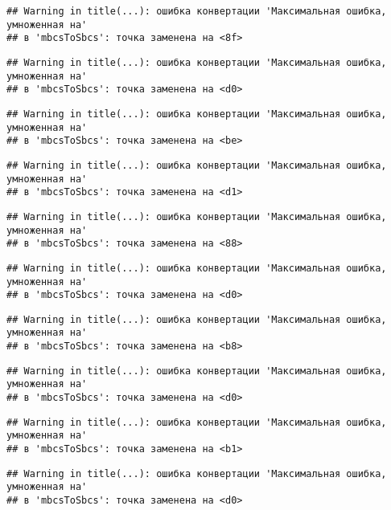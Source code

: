 \documentclass[
]{article}
\begin{document}
\begin{verbatim}
## Warning in title(...): ошибка конвертации 'Максимальная ошибка, умноженная на'
## в 'mbcsToSbcs': точка заменена на <8f>
\end{verbatim}

\begin{verbatim}
## Warning in title(...): ошибка конвертации 'Максимальная ошибка, умноженная на'
## в 'mbcsToSbcs': точка заменена на <d0>
\end{verbatim}

\begin{verbatim}
## Warning in title(...): ошибка конвертации 'Максимальная ошибка, умноженная на'
## в 'mbcsToSbcs': точка заменена на <be>
\end{verbatim}

\begin{verbatim}
## Warning in title(...): ошибка конвертации 'Максимальная ошибка, умноженная на'
## в 'mbcsToSbcs': точка заменена на <d1>
\end{verbatim}

\begin{verbatim}
## Warning in title(...): ошибка конвертации 'Максимальная ошибка, умноженная на'
## в 'mbcsToSbcs': точка заменена на <88>
\end{verbatim}

\begin{verbatim}
## Warning in title(...): ошибка конвертации 'Максимальная ошибка, умноженная на'
## в 'mbcsToSbcs': точка заменена на <d0>
\end{verbatim}

\begin{verbatim}
## Warning in title(...): ошибка конвертации 'Максимальная ошибка, умноженная на'
## в 'mbcsToSbcs': точка заменена на <b8>
\end{verbatim}

\begin{verbatim}
## Warning in title(...): ошибка конвертации 'Максимальная ошибка, умноженная на'
## в 'mbcsToSbcs': точка заменена на <d0>
\end{verbatim}

\begin{verbatim}
## Warning in title(...): ошибка конвертации 'Максимальная ошибка, умноженная на'
## в 'mbcsToSbcs': точка заменена на <b1>
\end{verbatim}

\begin{verbatim}
## Warning in title(...): ошибка конвертации 'Максимальная ошибка, умноженная на'
## в 'mbcsToSbcs': точка заменена на <d0>
\end{verbatim}
\end{document}
